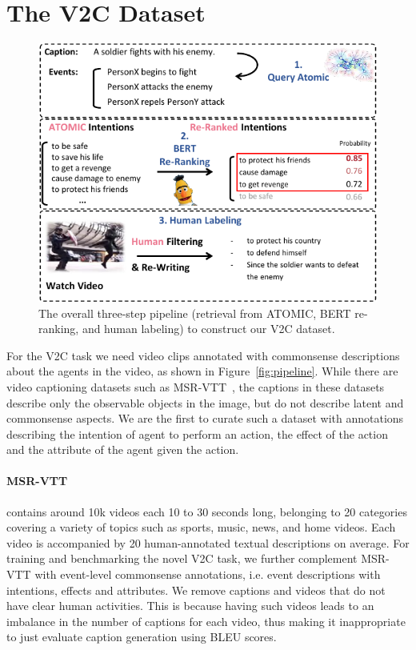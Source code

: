         




\section{The V2C Dataset}
\begin{figure}[t]
    \centering
    \includegraphics[width=\linewidth]{v2c/fig/v2cdataset.pdf}
    \caption{The overall three-step pipeline (retrieval from ATOMIC, BERT re-ranking, and human labeling) to construct our V2C dataset.}
    \label{fig:v2cdataset}
\end{figure}

For the V2C task we need video clips annotated with commonsense descriptions about the agents in the video, as shown in Figure~\ref{fig:pipeline}.
While there are video captioning datasets such as  MSR-VTT~\cite{xu2016msr}, the captions in these datasets describe only the observable objects in the image, but do not describe latent and commonsense aspects.
We are the first to curate such a dataset with annotations describing the intention of agent to perform an action, the effect of the action and the attribute of the agent given the action.

\paragraph{M{SR-VTT}} contains around 10k videos each 10 to 30 seconds long, belonging to 20 categories covering a variety of topics such as sports, music, news, and home videos.
Each video is accompanied by 20 human-annotated textual descriptions on average.
For training and benchmarking the novel V2C task,  we further complement MSR-VTT with event-level commonsense annotations, i.e. event descriptions with intentions, effects and attributes. 
We remove captions and videos that do not have clear human activities.
This is because having such videos leads to an imbalance in the number of captions for each video, thus making it inappropriate to just evaluate caption generation using BLEU scores.

